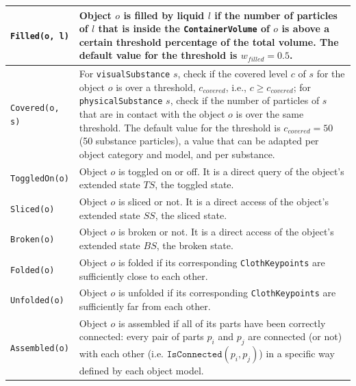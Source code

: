\begin{table}[!htbp]
\begin{center}
{\begin{tabular}{ | m{} | m{} | }
\texttt{Filled(o, l)} & Object $o$ is filled by liquid $l$ if the number of particles of $l$ that is inside the \texttt{ContainerVolume} of $o$ is above a certain threshold percentage of the total volume. The default value for the threshold is $w_\mathit{filled}=0.5$. \\
\hline
\texttt{Covered(o, s)} & For \texttt{visualSubstance} $s$, check if the covered level $c$ of $s$ for the object $o$ is over a threshold, $c_\mathit{covered}$, i.e., $c \geq c_\mathit{covered}$; for \texttt{physicalSubstance} $s$, check if the number of particles of $s$ that are in contact with the object $o$ is over the same threshold. The default value for the threshold is $c_\mathit{covered}=50$ (50 substance particles), a value that can be adapted per object category and model, and per substance.\\
\hline
\texttt{ToggledOn(o)} & Object $o$ is toggled on or off. It is a direct query of the object's extended state $\mathit{TS}$, the toggled state.\\ 
\hline
\texttt{Sliced(o)} & Object $o$ is sliced or not. It is a direct access of the object's extended state $\mathit{SS}$, the sliced state.\\
\hline
\texttt{Broken(o)} & Object $o$ is broken or not. It is a direct access of the object's extended state $\mathit{BS}$, the broken state.\\
\hline
\texttt{Folded(o)} & Object $o$ is folded if its corresponding \texttt{ClothKeypoints} are sufficiently close to each other.\\
\hline
\texttt{Unfolded(o)} & Object $o$ is unfolded if its corresponding \texttt{ClothKeypoints} are sufficiently far from each other.\\
\hline
\texttt{Assembled(o)} & Object $o$ is assembled if all of its parts have been correctly connected: every pair of parts $p_i$ and $p_j$ are connected (or not) with each other (i.e. $\texttt{IsConnected}(p_i, p_j)$) in a specific way defined by each object model.\\

\end{tabular}}
\end{center}
\end{table}
